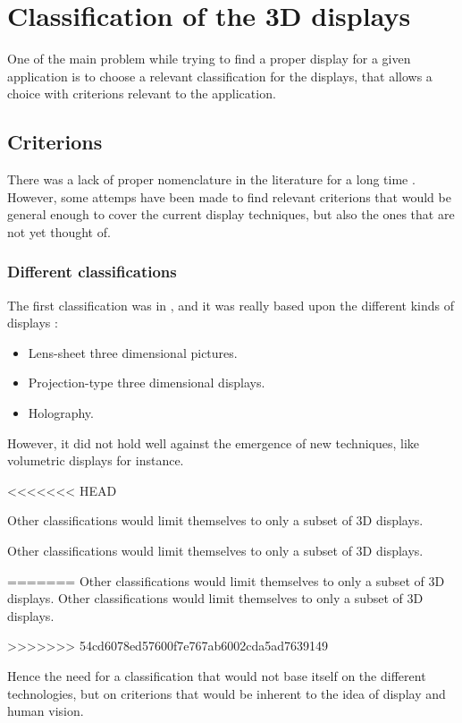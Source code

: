 \section{Classification of the 3D displays}
One of the main problem while trying to find a proper \gls{display} for a given application is to choose a relevant classification for the displays, that allows a choice with criterions relevant to the application.
\subsection{Criterions}
There was a lack of proper nomenclature in the literature for a long time \cite{pimenta2012comprehensive}. However, some attemps have been made to find relevant criterions that would be general enough to cover the current display techniques, but also the ones that are not yet thought of.

\subsubsection{Different classifications}
The first classification was in \cite{okoshi1976three}, and it was really based upon the different kinds of displays : 
\begin{itemize}
\item Lens-sheet three dimensional pictures.
\item Projection-type three dimensional displays.
\item Holography.
\end{itemize}

However, it did not hold well against the emergence of new techniques, like volumetric displays for instance.

<<<<<<< HEAD

Other classifications %
would limit themselves to only a subset of 3D displays.

Other classifications \cite{refnécessaire} would limit themselves to only a subset of 3D displays.


=======
Other classifications %
would limit themselves to only a subset of 3D displays.
Other classifications \cite{refnécessaire} would limit themselves to only a subset of 3D displays.

>>>>>>> 54cd6078ed57600f7e767ab6002cda5ad7639149

Hence the need for a classification that would not base itself on the different technologies, but on criterions that would be inherent to the idea of display and human vision.

